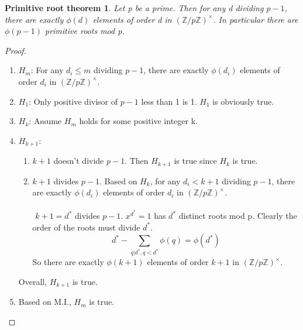 \documentclass{article}
\newtheorem*{thm}{Primitive root theorem}
\theoremstyle{definition}\newtheorem{definition}{Definition}
\begin{document}
	\begin{thm}
		Let p be a prime. Then for any d dividing $p-1$, there are exactly $\phi(d)$ elements of order d in $(\mathbb Z / p \mathbb Z)^\times$. In particular there are $\phi(p-1)$ primitive roots mod p.
	\end{thm}
	
	\begin{proof}\
		\begin{enumerate}
			\item $H_m$: For any $d_i \leq m$ dividing $p-1$, there are exactly $\phi(d_i)$ elements of order $d_i$ in $(\mathbb Z / p \mathbb Z)^\times$.
			\item $H_1$: Only positive divisor of $p-1$ less than 1 is 1. $H_1$ is obviously true.
			\item $H_k$: Assume $H_m$ holds for some positive integer k.
			\item $H_{k+1}$:\
				\begin{enumerate}
					\item $k+1$ doesn't divide $p-1$. Then $H_{k+1}$ is true since $H_k$ is true.
					\item $k+1$ divides $p-1$. Based on $H_k$, for any $d_i < k+1$ dividing $p-1$, there are exactly $\phi(d_i)$ elements of order $d_i$ in $(\mathbb Z / p \mathbb Z)^\times$.\\\\ $k+1=d^*$ divides $p-1$. $x^{d^*}=1$ has $d^*$ distinct roots mod p. Clearly the order of the roots must divide $d^*$. 
						\begin{equation}
							d^{*}-\sum_{q | d^{*},  q<d^*} \phi(q)=\phi(d^{*})
						\end{equation}
						So there are exactly $\phi(k+1)$ elements of order $k+1$ in $(\mathbb Z / p \mathbb Z)^\times$.
				\end{enumerate}
				Overall, $H_{k+1}$ is true.
			\item Based on M.I., $H_m$ is true.
		\end{enumerate}
	\end{proof}		
\end{document}

